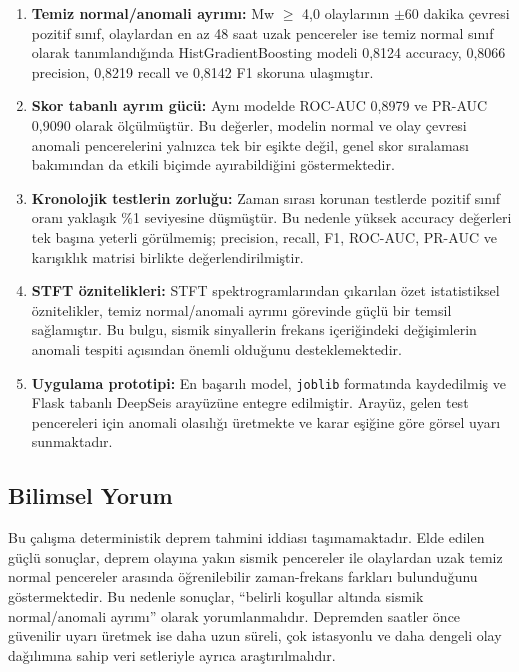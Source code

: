 \begin{enumerate}
    \item \textbf{Temiz normal/anomali ayrımı:} Mw $\geq$ 4,0 olaylarının $\pm$60 dakika çevresi pozitif sınıf, olaylardan en az 48 saat uzak pencereler ise temiz normal sınıf olarak tanımlandığında HistGradientBoosting modeli 0,8124 accuracy, 0,8066 precision, 0,8219 recall ve 0,8142 F1 skoruna ulaşmıştır.
    
    \item \textbf{Skor tabanlı ayrım gücü:} Aynı modelde ROC-AUC 0,8979 ve PR-AUC 0,9090 olarak ölçülmüştür. Bu değerler, modelin normal ve olay çevresi anomali pencerelerini yalnızca tek bir eşikte değil, genel skor sıralaması bakımından da etkili biçimde ayırabildiğini göstermektedir.
    
    \item \textbf{Kronolojik testlerin zorluğu:} Zaman sırası korunan testlerde pozitif sınıf oranı yaklaşık \%1 seviyesine düşmüştür. Bu nedenle yüksek accuracy değerleri tek başına yeterli görülmemiş; precision, recall, F1, ROC-AUC, PR-AUC ve karışıklık matrisi birlikte değerlendirilmiştir.
    
    \item \textbf{STFT öznitelikleri:} STFT spektrogramlarından çıkarılan özet istatistiksel öznitelikler, temiz normal/anomali ayrımı görevinde güçlü bir temsil sağlamıştır. Bu bulgu, sismik sinyallerin frekans içeriğindeki değişimlerin anomali tespiti açısından önemli olduğunu desteklemektedir.
    
    \item \textbf{Uygulama prototipi:} En başarılı model, \texttt{joblib} formatında kaydedilmiş ve Flask tabanlı DeepSeis arayüzüne entegre edilmiştir. Arayüz, gelen test pencereleri için anomali olasılığı üretmekte ve karar eşiğine göre görsel uyarı sunmaktadır.
\end{enumerate}

\subsection{Bilimsel Yorum}

Bu çalışma deterministik deprem tahmini iddiası taşımamaktadır. Elde edilen güçlü sonuçlar, deprem olayına yakın sismik pencereler ile olaylardan uzak temiz normal pencereler arasında öğrenilebilir zaman-frekans farkları bulunduğunu göstermektedir. Bu nedenle sonuçlar, ``belirli koşullar altında sismik normal/anomali ayrımı'' olarak yorumlanmalıdır. Depremden saatler önce güvenilir uyarı üretmek ise daha uzun süreli, çok istasyonlu ve daha dengeli olay dağılımına sahip veri setleriyle ayrıca araştırılmalıdır.

